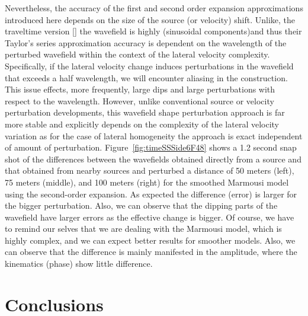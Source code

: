 Nevertheless, the accuracy of the first and second order expansion approximations introduced here depends on the size of the source (or velocity) shift. Unlike, the
traveltime version [\cite{tariqds}] the wavefield is highly  (sinusoidal components)and thus their Taylor's series approximation accuracy is dependent on the wavelength of the perturbed wavefield
within the context of the lateral velocity complexity. 
Specifically, if the lateral velocity change induces perturbations in the wavefield that 
exceeds a half wavelength, we will encounter aliasing in the construction. This issue effects, more frequently, large dips and large perturbations with
respect to the wavelength. However, unlike conventional source or velocity perturbation developments, this wavefield shape perturbation approach is far more 
stable and explicitly depends on the complexity of the lateral velocity variation as for the case of lateral homogeneity the approach is exact independent of 
amount of perturbation.
Figure~\ref{fig:timeSSSide6F48} shows a 1.2 second snap shot of the differences between the wavefields obtained directly from a source and that obtained from nearby sources
and perturbed a distance of 50 meters (left), 75 meters (middle), and 100 meters (right) for the smoothed Marmousi model using the second-order expansion. 
As expected the difference (error) is larger for the bigger perturbation.
Also, we can observe that the dipping parts of the wavefield have larger errors as the effective change is bigger. Of course, we have to remind our selves that 
we are dealing with the Marmousi model, which is highly complex, and we can expect better results for smoother models. Also,
we can observe that the difference is mainly manifested in the amplitude, where the kinematics (phase)  show little difference.

\section{Conclusions}

